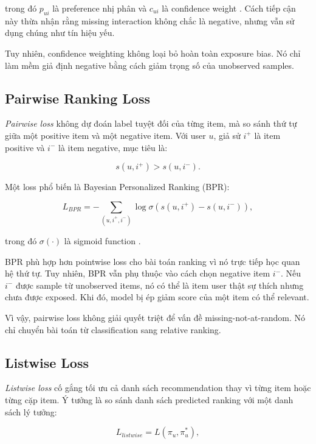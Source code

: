 \documentclass[12pt,a4paper]{article}
\begin{document}
trong đó $p_{ui}$ là preference nhị phân và $c_{ui}$ là confidence weight \cite{hu2008collaborative}. Cách tiếp cận này thừa nhận rằng missing interaction không chắc là negative, nhưng vẫn sử dụng chúng như tín hiệu yếu.

Tuy nhiên, confidence weighting không loại bỏ hoàn toàn exposure bias. Nó chỉ làm mềm giả định negative bằng cách giảm trọng số của unobserved samples.

\subsection{Pairwise Ranking Loss}

\textit{Pairwise loss} không dự đoán label tuyệt đối của từng item, mà so sánh thứ tự giữa một positive item và một negative item. Với user $u$, giả sử $i^+$ là item positive và $i^-$ là item negative, mục tiêu là:

\begin{equation}
s(u,i^+) > s(u,i^-).
\end{equation}

Một loss phổ biến là Bayesian Personalized Ranking (BPR):

\begin{equation}
L_{BPR} = - \sum_{(u,i^+,i^-)} \log \sigma(s(u,i^+) - s(u,i^-)),
\end{equation}

trong đó $\sigma(\cdot)$ là sigmoid function \cite{rendle2009bpr}.

BPR phù hợp hơn pointwise loss cho bài toán ranking vì nó trực tiếp học quan hệ thứ tự. Tuy nhiên, BPR vẫn phụ thuộc vào cách chọn negative item $i^-$. Nếu $i^-$ được sample từ unobserved items, nó có thể là item user thật sự thích nhưng chưa được exposed. Khi đó, model bị ép giảm score của một item có thể relevant.

Vì vậy, pairwise loss không giải quyết triệt để vấn đề missing-not-at-random. Nó chỉ chuyển bài toán từ classification sang relative ranking.

\subsection{Listwise Loss}

\textit{Listwise loss} cố gắng tối ưu cả danh sách recommendation thay vì từng item hoặc từng cặp item. Ý tưởng là so sánh danh sách predicted ranking với một danh sách lý tưởng:

\begin{equation}
L_{listwise} = L(\pi_u, \pi_u^*),
\end{equation}
\end{document}
